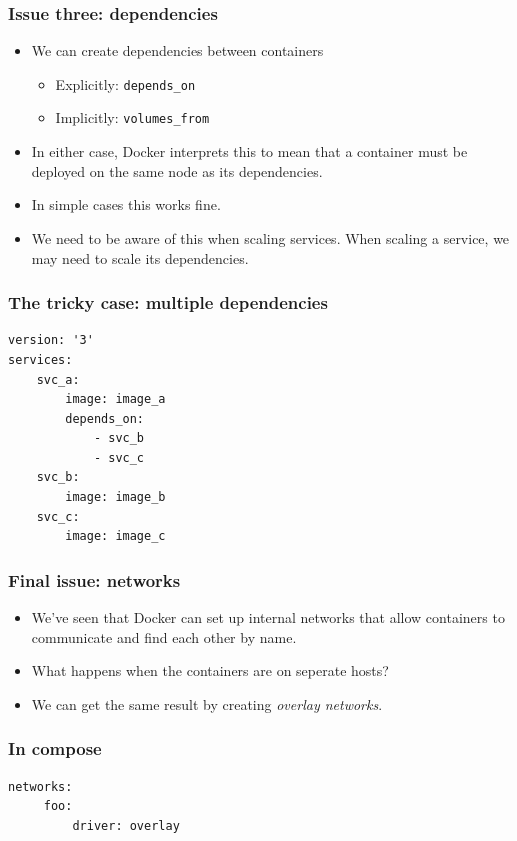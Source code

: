 \documentclass[10pt]{beamer}
\begin{document}
\begin{frame}
  \frametitle{Issue three: dependencies}
   
   \begin{itemize}
     \item We can create dependencies between containers
              \begin{itemize}
                \item Explicitly: \texttt{depends\_on}
                \item Implicitly: \texttt{volumes\_from}
              \end{itemize}
         
     \item In either case, Docker interprets this to mean that a container must be deployed on the same node as its dependencies.
     \item In simple cases this works fine.
     \item We need to be aware of this when scaling services. When scaling a service, we may need to scale its dependencies.
   \end{itemize}
\end{frame}


\begin{frame}[fragile]
    \frametitle{The tricky case: multiple dependencies}
    
    \begin{verbatim}
version: '3'
services:
    svc_a:  
        image: image_a
        depends_on:
            - svc_b
            - svc_c
    svc_b:  
        image: image_b
    svc_c:  
        image: image_c
    \end{verbatim}
\end{frame}

\begin{frame}
  \frametitle{Final issue: networks}
   
   \begin{itemize}
     \item We've seen that Docker can set up internal networks that allow containers to communicate and find each other by name.   
     \item What happens when the containers are on seperate hosts?
     \item We can get the same result by creating \emph{overlay networks}.
   \end{itemize}
\end{frame}

\begin{frame}[fragile]
    \frametitle{In compose}
     \begin{verbatim}
networks:
     foo:
         driver: overlay
     \end{verbatim}
 \end{frame}
 
\end{document}
